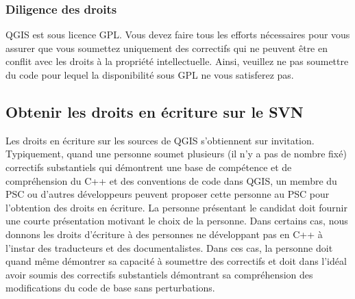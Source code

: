 \subsubsection{Diligence des droits}
QGIS est sous licence GPL. Vous devez faire tous les efforts n\'ecessaires pour vous assurer que vous soumettez uniquement des correctifs qui ne peuvent \^etre en conflit avec les droits \`a la propri\'et\'e intellectuelle. Ainsi, veuillez ne pas soumettre du code pour lequel la disponibilit\'e sous GPL ne vous satisferez pas.

\subsection{Obtenir les droits en \'ecriture sur le SVN}
Les droits en \'ecriture sur les sources de QGIS s'obtiennent sur invitation. Typiquement, quand une personne soumet plusieurs (il n'y a pas de nombre fix\'e) correctifs substantiels qui d\'emontrent une base de comp\'etence et de compr\'ehension du C++ et des conventions de code dans QGIS, un membre du PSC ou d'autres d\'eveloppeurs peuvent proposer cette personne au PSC pour l'obtention des droits en \'ecriture. La personne pr\'esentant le candidat doit fournir une courte pr\'esentation motivant le choix de la personne. Dans certains cas, nous donnons les droits d'\'ecriture \`a des personnes ne d\'eveloppant pas en C++ \`a l'instar des traducteurs et des documentalistes. Dans ces cas, la personne doit quand m\^eme d\'emontrer sa capacit\'e \`a soumettre des correctifs et doit dans l'id\'eal avoir soumis des correctifs substantiels d\'emontrant sa compr\'ehension des modifications du code de base sans perturbations.

